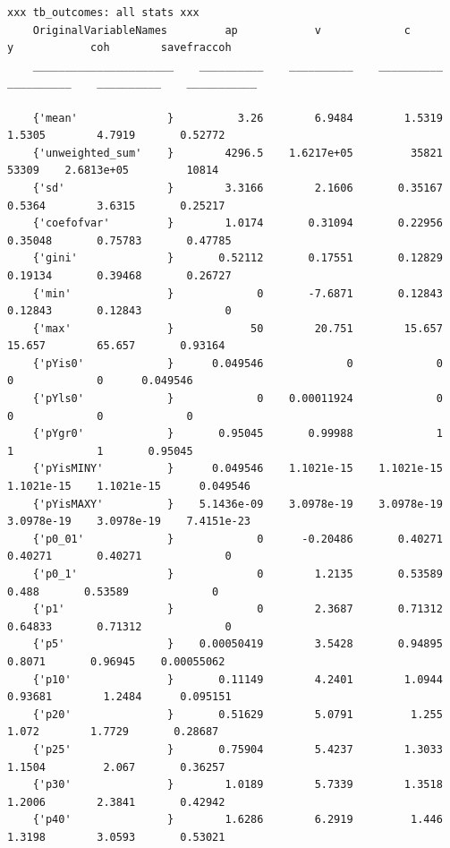 \documentclass[
]{book}
\begin{document}
\begin{verbatim}
xxx tb_outcomes: all stats xxx
    OriginalVariableNames         ap            v             c             y            coh        savefraccoh
    ______________________    __________    __________    __________    __________    __________    ___________

    {'mean'              }          3.26        6.9484        1.5319        1.5305        4.7919       0.52772 
    {'unweighted_sum'    }        4296.5    1.6217e+05         35821         53309    2.6813e+05         10814 
    {'sd'                }        3.3166        2.1606       0.35167        0.5364        3.6315       0.25217 
    {'coefofvar'         }        1.0174       0.31094       0.22956       0.35048       0.75783       0.47785 
    {'gini'              }       0.52112       0.17551       0.12829       0.19134       0.39468       0.26727 
    {'min'               }             0       -7.6871       0.12843       0.12843       0.12843             0 
    {'max'               }            50        20.751        15.657        15.657        65.657       0.93164 
    {'pYis0'             }      0.049546             0             0             0             0      0.049546 
    {'pYls0'             }             0    0.00011924             0             0             0             0 
    {'pYgr0'             }       0.95045       0.99988             1             1             1       0.95045 
    {'pYisMINY'          }      0.049546    1.1021e-15    1.1021e-15    1.1021e-15    1.1021e-15      0.049546 
    {'pYisMAXY'          }    5.1436e-09    3.0978e-19    3.0978e-19    3.0978e-19    3.0978e-19    7.4151e-23 
    {'p0_01'             }             0      -0.20486       0.40271       0.40271       0.40271             0 
    {'p0_1'              }             0        1.2135       0.53589         0.488       0.53589             0 
    {'p1'                }             0        2.3687       0.71312       0.64833       0.71312             0 
    {'p5'                }    0.00050419        3.5428       0.94895        0.8071       0.96945    0.00055062 
    {'p10'               }       0.11149        4.2401        1.0944       0.93681        1.2484      0.095151 
    {'p20'               }       0.51629        5.0791         1.255         1.072        1.7729       0.28687 
    {'p25'               }       0.75904        5.4237        1.3033        1.1504         2.067       0.36257 
    {'p30'               }        1.0189        5.7339        1.3518        1.2006        2.3841       0.42942 
    {'p40'               }        1.6286        6.2919         1.446        1.3198        3.0593       0.53021 

\end{verbatim}
\end{document}
